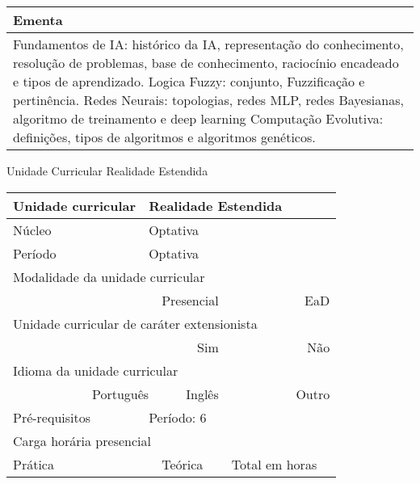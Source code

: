 \begin{quadro}[h!]
\begin{tabular}{|p{3cm} p{2cm} p{3cm} p{2cm} p{3cm} p{2cm}|}
\multicolumn{6}{|p{15cm}|}{\cellcolor{blue1} Ementa} \\\hline
\hline\multicolumn{6}{|p{15cm}|}{\scriptsize Fundamentos de IA: histórico da IA, representação do conhecimento, resolução de problemas, base de conhecimento, raciocínio encadeado e tipos de aprendizado. Logica Fuzzy: conjunto, Fuzzificação e pertinência. Redes Neurais: topologias, redes MLP, redes Bayesianas, algoritmo de treinamento e deep learning Computação Evolutiva: definições, tipos de algoritmos e algoritmos genéticos.}\\\hline
\hline
	\end{tabular}
\end{quadro}
\begin{quadro}[h!]
  \centering\scriptsize
\caption{Unidade Curricular Realidade Estendida}
\label{ unit_49 }
\begin{tabular}{|p{3cm} p{2cm} p{3cm} p{2cm} p{3cm} p{2cm}|}\hline
\multicolumn{1}{|p{3cm}|}{\cellcolor{blue1} Unidade curricular} & \multicolumn{5}{p{9cm}|}{ Realidade Estendida }\\\hline
\multicolumn{1}{|p{3cm}|}{\cellcolor{blue1} Núcleo} & \multicolumn{5}{p{11.5cm}|}{ Optativa }\\\hline
\multicolumn{1}{|p{3cm}|}{\cellcolor{blue1} Período} & \multicolumn{5}{p{9cm}|}{ Optativa }\\\hline
\multicolumn{6}{|p{15cm}|}{\cellcolor{blue1} Modalidade da unidade curricular} \\\hline
\multicolumn{2}{|r}{		} &  \multicolumn{2}{r}{Presencial \Square } & \multicolumn{2}{r|}{EaD \XBox	} \\\hline
\multicolumn{6}{|p{15cm}|}{\cellcolor{blue1} Unidade curricular de caráter extensionista} \\\hline
\multicolumn{4}{|r}{			Sim \Square	} & \multicolumn{2}{r|}{	Não \XBox	}\\\hline
\multicolumn{6}{|p{15cm}|}{\cellcolor{blue1} Idioma da unidade curricular} \\ \hline
\multicolumn{2}{|r}{	Português \XBox	} &  \multicolumn{2}{r}{	Inglês \Square	} & \multicolumn{2}{r|}{	Outro \Square	} \\ \hline
\multicolumn{1}{|p{3cm}|}{\cellcolor{blue1} Pré-requisitos} & \multicolumn{5}{p{9cm}|}{ Período: 6 }\\ \hline
\multicolumn{6}{|p{15cm}|}{\cellcolor{blue1} Carga horária presencial} \\ \hline
\multicolumn{1}{|p{3cm}|}{\raggedleft Prática} & \multicolumn{1}{p{1cm}|}{\centering	0	} &  \multicolumn{1}{p{3cm}|}{\raggedleft Teórica}  & \multicolumn{1}{p{1cm}|}{\centering 	0 } & \multicolumn{1}{p{3cm}|}{\raggedleft Total em horas} & \multicolumn{1}{p{1cm}|}{\raggedleft	0	} \\ \hline

\end{tabular}
\end{quadro}
